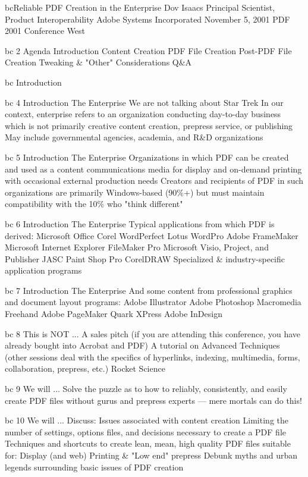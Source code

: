 \documentclass[11pt,a4paper]{article}
\begin{document}
bcReliable PDF Creation in the Enterprise Dov Isaacs Principal Scientist, Product Interoperability Adobe Systems Incorporated November 5, 2001 PDF 2001 Conference West

bc 2 Agenda Introduction Content Creation PDF File Creation Post-PDF File Creation Tweaking \& "Other" Considerations Q\&A

bc Introduction

bc 4 Introduction The Enterprise We are not talking about Star Trek In our context, enterprise refers to an organization conducting day-to-day business which is not primarily creative content creation, prepress service, or publishing May include governmental agencies, academia, and R\&D organizations

bc 5 Introduction The Enterprise Organizations in which PDF can be created and used as a content communications media for display and on-demand printing with occasional external production needs Creators and recipients of PDF in such organizations are primarily Windows-based (90\%+) but must maintain compatibility with the 10\% who "think different"

bc 6 Introduction The Enterprise Typical applications from which PDF is derived: Microsoft Office Corel WordPerfect Lotus WordPro Adobe FrameMaker Microsoft Internet Explorer FileMaker Pro Microsoft Visio, Project, and Publisher JASC Paint Shop Pro CorelDRAW Specialized \& industry-specific application programs

bc 7 Introduction The Enterprise And some content from professional graphics and document layout programs: Adobe Illustrator Adobe Photoshop Macromedia Freehand Adobe PageMaker Quark XPress Adobe InDesign

bc 8 This is NOT ... A sales pitch (if you are attending this conference, you have already bought into Acrobat and PDF) A tutorial on Advanced Techniques (other sessions deal with the specifics of hyperlinks, indexing, multimedia, forms, collaboration, prepress, etc.) Rocket Science

bc 9 We will ... Solve the puzzle as to how to reliably, consistently, and easily create PDF files without gurus and prepress experts --- mere mortals can do this!

bc 10 We will ... Discuss: Issues associated with content creation Limiting the number of settings, options files, and decisions necessary to create a PDF file Techniques and shortcuts to create lean, mean, high quality PDF files suitable for: Display (and web) Printing \& "Low end" prepress Debunk myths and urban legends surrounding basic issues of PDF creation
\end{document}
